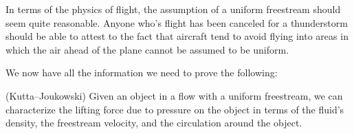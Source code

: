 \documentclass[letterpaper, twoside, 12 pt]{article}
\begin{document}
	\begin{remark}
		In terms of the physics of flight, the assumption of a uniform freestream should seem quite reasonable.
		Anyone who's flight has been canceled for a thunderstorm should be able to attest to the fact that aircraft tend to avoid flying into areas in which the air ahead of the plane cannot be assumed to be uniform.
	\end{remark}

	We now have all the information we need to prove the following:

	\begin{theorem}(Kutta--Joukowski)
		Given an object in a flow with a uniform freestream, we can characterize the lifting force due to pressure on the object in terms of the fluid's density, the freestream velocity, and the circulation around the object.
	\end{theorem}
\end{document}

